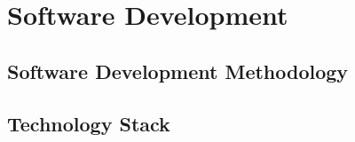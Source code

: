 \chapter{Software Development}
\label{chap:software-development}

\section{Software Development Methodology}
\label{section:software-development-methodology}



\section{Technology Stack}



